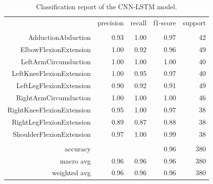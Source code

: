 \begin{table}[h!]
	\centering
	\caption{Classification report of the CNN-LSTM model.}
	\label{tab:CNNLSTMreport}
	\begin{tabular}{rrrrr}
		\multicolumn{1}{l}{}      & precision            & recall               & f1-score             & support              \\
		\multicolumn{1}{l}{}      &                      &                      &                      &                      \\
		AdductionAbduction        & 0.93                 & 1.00                 & 0.97                 & 42                   \\
		ElbowFlexionExtension     & 1.00                 & 0.92                 & 0.96                 & 49                   \\
		LeftArmCircumduction      & 1.00                 & 1.00                 & 1.00                 & 40                   \\
		LeftKneeFlexionExtension  & 1.00                 & 0.95                 & 0.97                 & 40                   \\
		LeftLegFlexionExtension   & 0.90                 & 0.92                 & 0.91                 & 49                   \\
		RightArmCircumduction     & 1.00                 & 1.00                 & 1.00                 & 46                   \\
		RightKneeFlexionExtension & 0.95                 & 1.00                 & 0.97                 & 38                   \\
		RightLegFlexionExtension  & 0.89                 & 0.87                 & 0.88                 & 38                   \\
		ShoulderFlexionExtension  & 0.97                 & 1.00                 & 0.99                 & 38                   \\
		\multicolumn{1}{l}{}      & \multicolumn{1}{l}{} & \multicolumn{1}{l}{} & \multicolumn{1}{l}{} & \multicolumn{1}{l}{} \\
		accuracy                  &                      &                      & 0.96                 & 380                  \\
		macro avg                 & 0.96                 & 0.96                 & 0.96                 & 380                  \\
		weighted avg              & 0.96                 & 0.96                 & 0.96                 & 380
	\end{tabular}%
\end{table}

